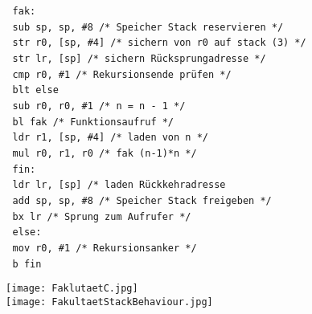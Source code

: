 \begin{minipage}{0.7\textwidth}
			\textcolor{white}{.} \hspace{0.4cm} \texttt{fak:} \\
			\textcolor{white}{.} \hspace{0.4cm} \texttt{sub sp, sp, \#8 /* Speicher Stack reservieren */} \\
			\textcolor{white}{.} \hspace{0.4cm} \texttt{str r0, [sp, \#4] /* sichern von r0 auf stack (3) */} \\
			\textcolor{white}{.} \hspace{0.4cm} \texttt{str lr, [sp] /* sichern Rücksprungadresse */} \\
			\textcolor{white}{.} \hspace{0.4cm} \texttt{cmp r0, \#1 /* Rekursionsende prüfen */} \\
			\textcolor{white}{.} \hspace{0.4cm} \texttt{blt else} \\
			\textcolor{white}{.} \hspace{0.4cm} \texttt{sub r0, r0, \#1 /* n = n - 1 */} \\
			\textcolor{white}{.} \hspace{0.4cm} \texttt{bl fak /* Funktionsaufruf */} \\
			\textcolor{white}{.} \hspace{0.4cm} \texttt{ldr r1, [sp, \#4] /* laden von n */} \\
			\textcolor{white}{.} \hspace{0.4cm} \texttt{mul r0, r1, r0 /* fak (n-1)*n */} \\
			\textcolor{white}{.} \hspace{0.4cm} \texttt{fin:} \\
			\textcolor{white}{.} \hspace{0.4cm} \texttt{ldr lr, [sp] /* laden Rückkehradresse} \\
			\textcolor{white}{.} \hspace{0.4cm} \texttt{add sp, sp, \#8 /* Speicher Stack freigeben */} \\
			\textcolor{white}{.} \hspace{0.4cm} \texttt{bx lr /* Sprung zum Aufrufer */} \\
			\textcolor{white}{.} \hspace{0.4cm} \texttt{else:} \\
			\textcolor{white}{.} \hspace{0.4cm} \texttt{mov r0, \#1 /* Rekursionsanker */} \\
			\textcolor{white}{.} \hspace{0.4cm} \texttt{b fin} \\
		\end{minipage}
		\begin{minipage}{0.25\textwidth}
			\texttt{[image: FaklutaetC.jpg]} \\
			\texttt{[image: FakultaetStackBehaviour.jpg]}
		\end{minipage}


